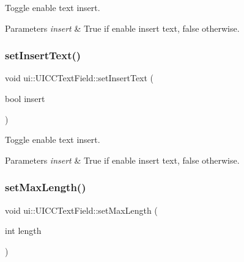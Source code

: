 Toggle enable text insert. 


\begin{DoxyParams}{Parameters}
{\em insert} & True if enable insert text, false otherwise. \\
\hline
\end{DoxyParams}
\mbox{\label{classui_1_1UICCTextField_a27a756bfbc4d7adbdb0015756ef399ef}} 
\subsubsection{\texorpdfstring{set\+Insert\+Text()}{setInsertText()}\hspace{0.1cm}{\footnotesize\ttfamily [2/2]}}
{\footnotesize\ttfamily void ui\+::\+U\+I\+C\+C\+Text\+Field\+::set\+Insert\+Text (\begin{DoxyParamCaption}\item[{bool}]{insert }\end{DoxyParamCaption})}



Toggle enable text insert. 


\begin{DoxyParams}{Parameters}
{\em insert} & True if enable insert text, false otherwise. \\
\hline
\end{DoxyParams}
\mbox{\label{classui_1_1UICCTextField_a34d3813016eefd391606ed1aa0b7f0b5}} 
\subsubsection{\texorpdfstring{set\+Max\+Length()}{setMaxLength()}\hspace{0.1cm}{\footnotesize\ttfamily [1/2]}}
{\footnotesize\ttfamily void ui\+::\+U\+I\+C\+C\+Text\+Field\+::set\+Max\+Length (\begin{DoxyParamCaption}\item[{int}]{length }\end{DoxyParamCaption})}

